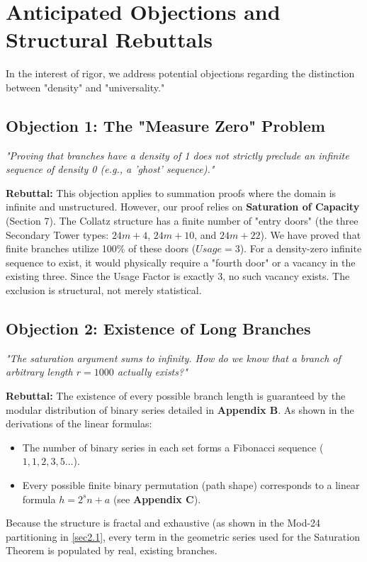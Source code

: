 \documentclass[sn-mathphys-num, pdflatex]{sn-jnl}
\begin{document}
\section{Anticipated Objections and Structural Rebuttals}
\label{app:D}

In the interest of rigor, we address potential objections regarding the distinction between "density" and "universality."

\subsection{Objection 1: The "Measure Zero" Problem}
\textit{"Proving that branches have a density of 1 does not strictly preclude an infinite sequence of density 0 (e.g., a 'ghost' sequence)."}

\textbf{Rebuttal:} This objection applies to summation proofs where the domain is infinite and unstructured. However, our proof relies on \textbf{Saturation of Capacity} (Section 7).
The Collatz structure has a finite number of "entry doors" (the three Secondary Tower types: $24m+4$, $24m+10$, and $24m+22$). We have proved that finite branches utilize 100\% of these doors ($Usage = 3$).
For a density-zero infinite sequence to exist, it would physically require a "fourth door" or a vacancy in the existing three. Since the Usage Factor is exactly 3, no such vacancy exists. The exclusion is structural, not merely statistical.

\subsection{Objection 2: Existence of Long Branches}
\textit{"The saturation argument sums to infinity. How do we know that a branch of arbitrary length $r=1000$ actually exists?"}

\textbf{Rebuttal:} The existence of every possible branch length is guaranteed by the modular distribution of binary series detailed in \textbf{Appendix B}. As shown in the derivations of the linear formulas:
\begin{itemize}
    \item The number of binary series in each set forms a Fibonacci sequence ($1, 1, 2, 3, 5...$).
    \item Every possible finite binary permutation (path shape) corresponds to a linear formula $h = 2^s n + a$ (see \textbf{Appendix C}).
\end{itemize}
Because the structure is fractal and exhaustive (as shown in the Mod-24 partitioning in \ref{sec2.1}, every term in the geometric series used for the Saturation Theorem is populated by real, existing branches.
\end{document}
